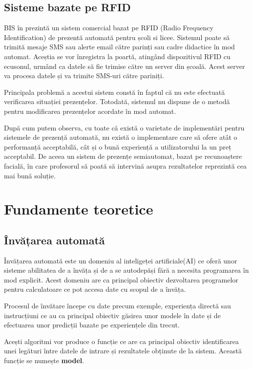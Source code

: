 \documentclass[a4paper, 12pt]{article}
\begin{document}
	\subsection{Sisteme  bazate pe RFID}
	\bigskip
	\quad\space BIS în \textbf{\cite{patel2014development}} prezintă un sistem comercial bazat pe RFID (Radio Frequency Identification) de prezentă automată pentru școli si licee. Sistemul poate să trimită mesaje SMS sau alerte email către parinți sau cadre didactice în mod automat. Aceștia se vor înregistra la poartă, atingând dispozitivul RFID cu ecusonul, urmând ca datele să fie trimise către un server din școală. Acest server va procesa datele și va trimite SMS-uri către pariniți.
	
	Principala problemă a acestui sistem constă în faptul că nu este efectuată verificarea situației prezențelor. Totodată, sistemul nu dispune de o metodă pentru modificarea prezențelor acordate în mod automat.
	
	După cum putem observa, cu toate că există o varietate de implementări pentru sistemele de prezență automată, nu există o implementare care să ofere atât o performanță acceptabilă, cât și o bună experiență a utilizatorului la un preț acceptabil. De aceea un sistem de prezențe semiautomat, bazat pe recunoaștere facială, în care profesorul să poată să intervină asupra rezultatelor reprezintă cea mai bună soluție.
	
	\newpage
	\section{Fundamente teoretice}
	\bigskip
	\subsection{Învățarea automată}
	\bigskip
	\quad\space Învățarea automată este un domeniu al inteligeței artificiale(AI) ce oferă unor sisteme abilitatea de a învăța și de a se autodepăși fără a necesita programarea în mod explicit. Acest domeniu are ca principal obiectiv dezvoltarea programelor pentru calculatoare ce pot accesa date cu scopul de a învăța.
	
	Procesul de învătare începe cu date precum exemple, experiența directă sau instrucțiuni ce au ca principal obiectiv găsirea unor modele în date și de efectuarea unor predicții bazate pe experiențele din trecut.
	
	Acești algoritmi vor produce o funcție ce are ca principal obiectiv identificarea unei legături între datele de intrare și rezultatele obținute de la sistem. Această funcție se numește \textbf{model}. \textbf{\cite{expert_system_2017}}
	
\end{document}
